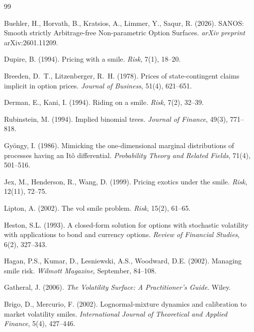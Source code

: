 \documentclass[11pt]{article}
\providecommand{\1}{\mathbf 1}
\begin{document}
\clearpage   %
{\small
\begin{thebibliography}{99}
\setlength{\itemsep}{0pt}

Buehler, H., Horvath, B., Kratsios, A., Limmer, Y., Saqur, R. (2026).
SANOS: Smooth strictly Arbitrage-free Non-parametric Option Surfaces.
\textit{arXiv preprint} arXiv:2601.11209.

Dupire, B. (1994). Pricing with a smile. \textit{Risk}, 7(1), 18--20.

Breeden, D.~T., Litzenberger, R.~H. (1978). Prices of state-contingent claims implicit in
option prices. \textit{Journal of Business}, 51(4), 621--651.

Derman, E., Kani, I. (1994). Riding on a smile. \textit{Risk}, 7(2), 32--39.

Rubinstein, M. (1994). Implied binomial trees.
\textit{Journal of Finance}, 49(3), 771--818.

Gy\"ongy, I. (1986).
Mimicking the one-dimensional marginal distributions of processes having an It\^o
differential.
\textit{Probability Theory and Related Fields}, 71(4), 501--516.

Jex, M., Henderson, R., Wang, D. (1999).
Pricing exotics under the smile. \textit{Risk}, 12(11), 72--75.

Lipton, A. (2002). The vol smile problem. \textit{Risk}, 15(2), 61--65.

Heston, S.L. (1993).
A closed-form solution for options with stochastic volatility with applications to
bond and currency options.
\textit{Review of Financial Studies}, 6(2), 327--343.

Hagan, P.S., Kumar, D., Lesniewski, A.S., Woodward, D.E. (2002).
Managing smile risk. \textit{Wilmott Magazine}, September, 84--108.

Gatheral, J. (2006).
\textit{The Volatility Surface: A Practitioner's Guide}. Wiley.

Brigo, D., Mercurio, F. (2002).
Lognormal-mixture dynamics and calibration to market volatility smiles.
\textit{International Journal of Theoretical and Applied Finance}, 5(4), 427--446.


\end{thebibliography}}
\end{document}
